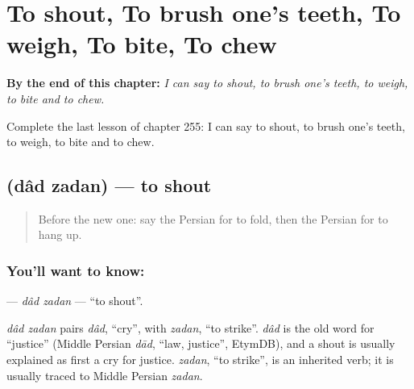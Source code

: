 
\chapter{To shout, To brush one's teeth, To weigh, To bite, To chew}
\label{ch:fa-to-shout-to-brush-one-s-teeth-to-weigh-to-bite-to-chew}

\begin{chapteropening}
\textbf{By the end of this chapter:} \emph{I can say to shout, to brush one's teeth, to weigh, to bite and to chew.}

Complete the last lesson of chapter 255: I can say to shout, to brush one's teeth, to weigh, to bite and to chew.
\end{chapteropening}

\section[\texorpdfstring{\fa{داد} \fa{زدن} (dâd zadan)}{داد زدن (dâd zadan)}]{  (dâd zadan) — to shout}

\label{lesson:FA-C255-dad-zadan}



\begin{quote}
Before the new one: say the Persian for to fold, then the Persian for to hang up.
\end{quote}

\subsection*{You'll want to know:  }
\textbf{ } — \emph{dâd zadan} — \textquotedblleft{}to shout\textquotedblright{}.

\begin{cousinweb}
\emph{dâd zadan} pairs \emph{dâd}, \textquotedblleft{}cry\textquotedblright{}, with \emph{zadan}, \textquotedblleft{}to strike\textquotedblright{}. \emph{dâd} is the old word for \textquotedblleft{}justice\textquotedblright{} (Middle Persian \emph{dād}, \textquotedblleft{}law, justice\textquotedblright{}, EtymDB), and a shout is usually explained as first a cry for justice. \emph{zadan}, \textquotedblleft{}to strike\textquotedblright{}, is an inherited verb; it is usually traced to Middle Persian \emph{zadan}.
\end{cousinweb}

